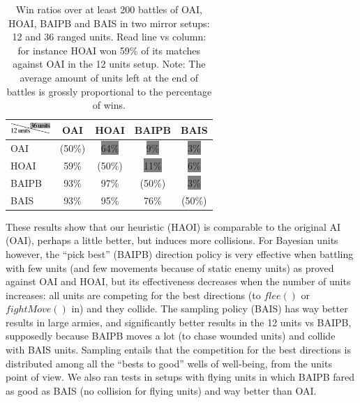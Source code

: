 \begin{table}[h]
\begin{center}
\begin{tabular}{l|c|c|c|c}
\includegraphics[width=1.5cm]{images/array_top2.png} & OAI & HOAI & BAIPB & BAIS \\
\hline
OAI & (50\%) & \colorbox{grey}{64\%} & \colorbox{grey}{9\%} & \colorbox{grey}{3\%} \\
HOAI & 59\% & (50\%) & \colorbox{grey}{11\%} & \colorbox{grey}{6\%} \\
BAIPB & 93\% & 97\% & (50\%) & \colorbox{grey}{3\%} \\
BAIS & 93\% & 95\% & 76\% & (50\%)
\end{tabular}
\end{center}
\caption{Win ratios over at least 200 battles of OAI, HOAI, BAIPB and BAIS in two mirror setups: 12 and 36 ranged units. Read line vs column: for instance HOAI won 59\% of its matches against OAI in the 12 units setup. Note: The average amount of units left at the end of battles is grossly proportional to the percentage of wins.}
\label{tab:win_ratios}
\end{table}

These results show that our heuristic (HAOI) is comparable to the original AI (OAI), perhaps a little better, but induces more collisions. For Bayesian units however, the ``pick best'' (BAIPB) direction policy is very effective when battling with few units (and few movements because of static enemy units) as proved against OAI and HOAI, but its effectiveness decreases when the number of units increases: all units are competing for the best directions (to $flee()$ or $fightMove()$ in) and they collide. The sampling policy (BAIS) has way better results in large armies, and significantly better results in the 12 units vs BAIPB, supposedly because BAIPB moves a lot (to chase wounded units) and collide with BAIS units. Sampling entails that the competition for the best directions is distributed among all the ``bests to good'' wells of well-being, from the units point of view. We also ran tests in setups with flying units in which BAIPB fared as good as BAIS (no collision for flying units) and way better than OAI.

